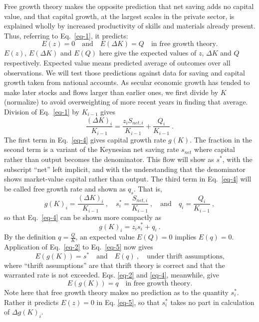 \documentclass[a4paper,fleqn]{latex_styles/cas-sc}
\begin{document}
Free growth theory makes the opposite prediction that net saving adds no capital value, and that capital growth, at the largest scales in the private sector, is explained wholly by increased productivity of skills and materials already present. Thus, referring to Eq.~\eqref{eq-1}, it predicts:
%
\begin{equation}
    E(z) = 0 \quad \text{and} \quad E(\Delta K) = Q \quad \text{in free growth theory.} \label{eq-3}
\end{equation}
%
\(E(z)\), \(E(\Delta K)\) and \(E(Q)\) here give the expected values of \(z\), \(\Delta K\)
and \(Q\) respectively. Expected value means predicted average of outcomes
over all observations.
We will test those predictions against data for saving and capital growth taken from national accounts.
As secular economic growth has tended to make
later stocks and flows larger than earlier ones, we first divide by
\(K\) (normalize) to avoid overweighting of more recent years in finding
that average. Division of Eq.~\eqref{eq-1} by \(K_{i - 1}\) gives
%
\begin{equation}
    \frac{(\Delta K)_{i}}{K_{i - 1}} = \frac{z_i S_{net,i}}{K_{i - 1}} + \frac{Q_{i}}{K_{i - 1}} \ .\label{eq-4}
\end{equation}
%
The first term in Eq.~\eqref{eq-4} gives capital growth rate \(g(K)\). The fraction in the second term is a
variant of the Keynesian net saving rate \(s_{net}\) where capital
rather than output becomes the denominator. This flow will show 
as \(s^{*}\), with the subscript ``net''
left implicit, and with the understanding that the denominator shows
market-value capital rather than output.
The third term in Eq.~\eqref{eq-4} will be called free growth rate and
shown as \(q_s\). That is,
%
\[g{(K)}_{i} = \frac{(\Delta K)_{i}}{K_{i - 1}} \ , \quad
s^{*}_{i} = \frac{S_{net,i}}{K_{i - 1}} \ , \quad \text{and} \quad
q_{i} = \frac{Q_{i}}{K_{i - 1}} \ ,\]
%
so that Eq.~\eqref{eq-4} can be shown more compactly as
%
\begin{equation}
g(K)_{i} = z_i s^{*}_{i} + q_{i} \ .\label{eq-5}
\end{equation}
%
By the definition \(q = \frac{Q}{K}\), an expected value \(E(Q) = 0\)
implies \(E(q) = 0\). Application of Eq.~\eqref{eq-2} to
Eq.~\eqref{eq-5} now gives
%
\begin{equation}
    E(g(K)) = s^* \quad \text{and} \quad E(q)\ , \quad \text{under thrift assumptions,}\label{eq-6}
\end{equation}
%
where ``thrift assumptions'' are that thrift theory is correct and that
the warranted rate is not exceeded. Eqs. \eqref{eq-2} and \eqref{eq-4}, meanwhile, give
%
\begin{equation}
    E(g(K)) = q \quad \text{in free growth theory.}\label{eq-7}
\end{equation}
%
Note here that free growth theory makes no prediction as to the quantity \(s^*_i\). Rather it predicts \(E(z)=0\) in Eq. \eqref{eq-5}, so that \(s^*_i\) takes no part in calculation of \(\Delta g(K)_i\). 
\end{document}
